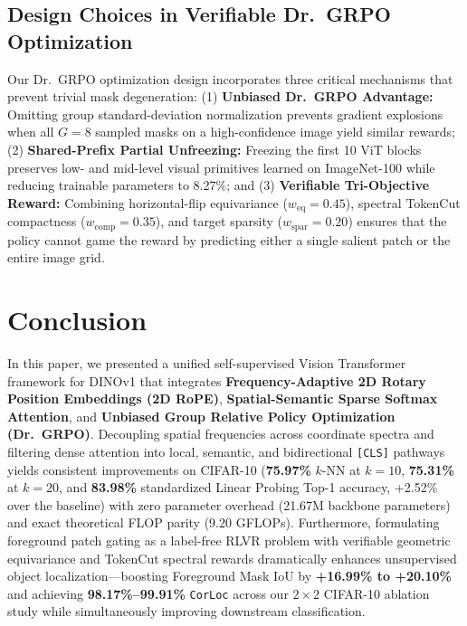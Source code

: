 \documentclass[11pt,a4paper]{article}
\begin{document}
\subsection{Design Choices in Verifiable Dr.\ GRPO Optimization}
Our Dr.\ GRPO optimization design incorporates three critical mechanisms that prevent trivial mask degeneration: (1) \textbf{Unbiased Dr.\ GRPO Advantage:} Omitting group standard-deviation normalization prevents gradient explosions when all $G=8$ sampled masks on a high-confidence image yield similar rewards; (2) \textbf{Shared-Prefix Partial Unfreezing:} Freezing the first 10 ViT blocks preserves low- and mid-level visual primitives learned on ImageNet-100 while reducing trainable parameters to 8.27\%; and (3) \textbf{Verifiable Tri-Objective Reward:} Combining horizontal-flip equivariance ($w_{\text{eq}}=0.45$), spectral TokenCut compactness ($w_{\text{comp}}=0.35$), and target sparsity ($w_{\text{spar}}=0.20$) ensures that the policy cannot game the reward by predicting either a single salient patch or the entire image grid.

\section{Conclusion}
\label{sec:conclusion}

In this paper, we presented a unified self-supervised Vision Transformer framework for DINOv1 that integrates \textbf{Frequency-Adaptive 2D Rotary Position Embeddings (2D RoPE)}, \textbf{Spatial-Semantic Sparse Softmax Attention}, and \textbf{Unbiased Group Relative Policy Optimization (Dr.\ GRPO)}. Decoupling spatial frequencies across coordinate spectra and filtering dense attention into local, semantic, and bidirectional \texttt{[CLS]} pathways yields consistent improvements on CIFAR-10 (\textbf{75.97\%} $k$-NN at $k=10$, \textbf{75.31\%} at $k=20$, and \textbf{83.98\%} standardized Linear Probing Top-1 accuracy, +2.52\% over the baseline) with zero parameter overhead (21.67M backbone parameters) and exact theoretical FLOP parity (9.20 GFLOPs). Furthermore, formulating foreground patch gating as a label-free RLVR problem with verifiable geometric equivariance and TokenCut spectral rewards dramatically enhances unsupervised object localization—boosting Foreground Mask IoU by \textbf{+16.99\% to +20.10\%} and achieving \textbf{98.17\%--99.91\%} \texttt{CorLoc} across our $2\times 2$ CIFAR-10 ablation study while simultaneously improving downstream classification.
\end{document}
